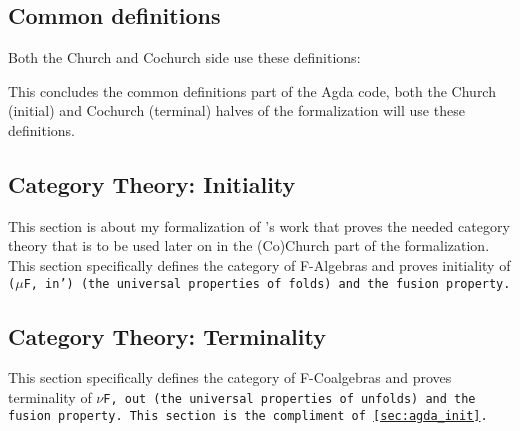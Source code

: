 \subsection{Common definitions}
Both the Church and Cochurch side use these definitions:

%
This concludes the common definitions part of the Agda code, both the Church (initial) and Cochurch (terminal) halves of the formalization will use these definitions.

\subsection{Category Theory: Initiality}\label{sec:agda_init}
This section is about my formalization of \cite{Harper2011}'s work that proves the needed category theory that is to be used later on in the (Co)Church part of the formalization.
This section specifically defines the category of F-Algebras and proves initiality of \tt($\mu$F, in') (the universal properties of folds) and the fusion property.



\subsection{Category Theory: Terminality}
This section specifically defines the category of F-Coalgebras and proves terminality of \tt{$\nu$F, out} (the universal properties of unfolds) and the fusion property.
This section is the compliment of \autoref{sec:agda_init}.


